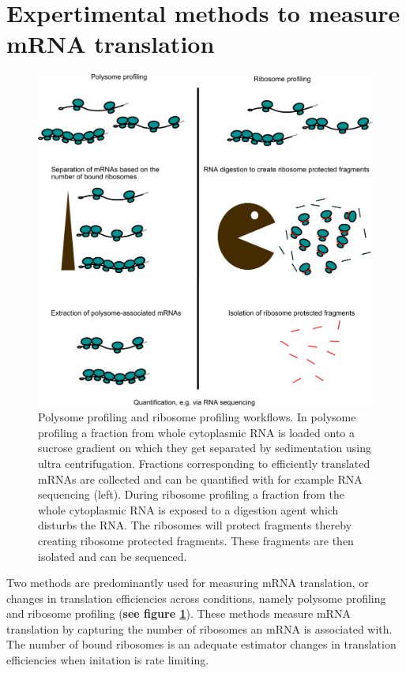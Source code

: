 \documentclass[12pt,openany]{book}
\begin{document}
\clearpage
\section{Expertimental methods to measure mRNA translation} \label{exptMethod}

\begin{figure}
    \includegraphics{./figures/polyRibo.pdf}
  \caption{Polysome profiling and ribosome profiling workflows. In polysome profiling a fraction from whole cytoplasmic RNA is loaded onto a sucrose gradient on which they get separated by sedimentation using ultra centrifugation. Fractions corresponding to efficiently translated mRNAs are collected and can be quantified with for example RNA sequencing (left). During ribosome profiling a fraction from the whole cytoplasmic RNA is exposed to a digestion agent which disturbs the RNA. The ribosomes will protect fragments thereby creating ribosome protected fragments. These fragments are then isolated and can be sequenced.  \label{fig:polyRibo}}
\end{figure}

Two methods are predominantly used for measuring mRNA translation, or
changes in translation efficiencies across conditions, namely polysome
profiling and ribosome profiling (\textbf{see figure
\ref{fig:polyRibo}}). These methods measure mRNA translation by
capturing the number of ribosomes an mRNA is associated with. The number
of bound ribosomes is an adequate estimator changes in translation
efficiencies when initation is rate limiting.
\end{document}
